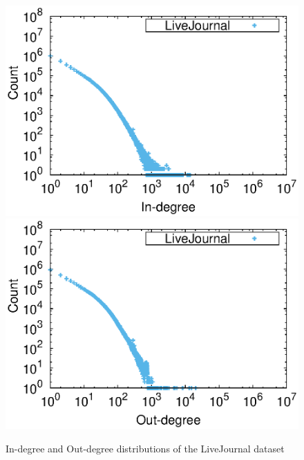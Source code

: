 \documentclass[12pt]{article}
\begin{document}
\begin{figure}[ht]
    \includegraphics[width=0.5\linewidth]{q4_1}
    \includegraphics[width=0.5\linewidth]{q4_2}
    \caption{In-degree and Out-degree distributions of the LiveJournal dataset}
\end{figure}
\end{document}
